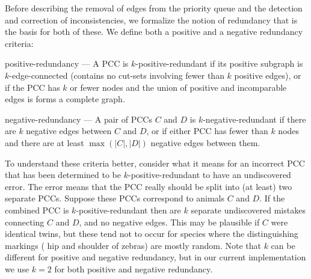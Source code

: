Before describing the removal of edges from the priority queue and the
detection and correction of inconsistencies, we formalize the notion of
redundancy that is the basis for both of these.
We define both a positive and a negative redundancy criteria:
\begin{enumln}

    \item positive-redundancy --- %
        A PCC is $k$-positive-redundant if its positive subgraph is
        $k$-edge-connected (contains no cut-sets involving fewer than $k$
        positive edges\cite{eswaran_augmentation_1976}), or if the PCC has $k$
        or fewer nodes and the union of positive and incomparable edges is
        forms a complete graph.

    \item negative-redundancy --- %
        A pair of PCCs $C$ and $D$ is $k$-negative-redundant if there are $k$
        negative edges between $C$ and $D$, or if either PCC has fewer than $k$
        nodes and there are at least $\mathop{max}(|C|, |D|)$ negative edges
        between them.
        

\end{enumln}
To understand these criteria better, consider what it means for an incorrect PCC that has been determined to be
$k$-positive-redundant to have an undiscovered error. The error means that the PCC really should be split into (at
least) two separate PCCs. Suppose these PCCs correspond to animals $C$ and $D$. If the combined PCC is
$k$-positive-redundant then are $k$ separate undiscovered mistakes connecting $C$ and $D$, and no negative edges. This
may be plausible if $C$ were identical twins, but these tend not to occur for species where the distinguishing markings
(\eg{} hip and shoulder of zebras) are mostly random. Note that $k$ can be different for positive and negative
redundancy, but in our current implementation we use $k=2$ for both positive and negative redundancy.

